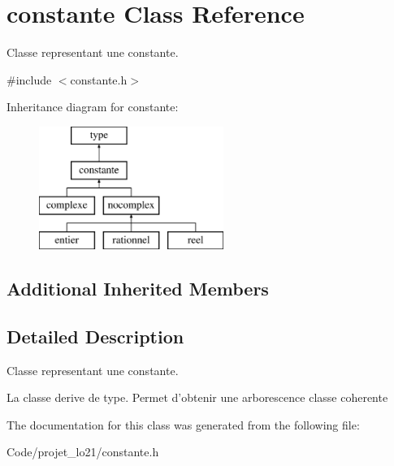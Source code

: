 \hypertarget{classconstante}{\section{constante Class Reference}
\label{classconstante}
}


Classe representant une constante.  




{\ttfamily \#include $<$constante.\-h$>$}

Inheritance diagram for constante\-:\begin{figure}[H]
\begin{center}
\leavevmode
\includegraphics[height=4.000000cm]{classconstante}
\end{center}
\end{figure}
\subsection*{Additional Inherited Members}


\subsection{Detailed Description}
Classe representant une constante. 

La classe derive de type. Permet d'obtenir une arborescence classe coherente 

The documentation for this class was generated from the following file\-:\begin{DoxyCompactItemize}
\item 
Code/projet\-\_\-lo21/constante.\-h\end{DoxyCompactItemize}
